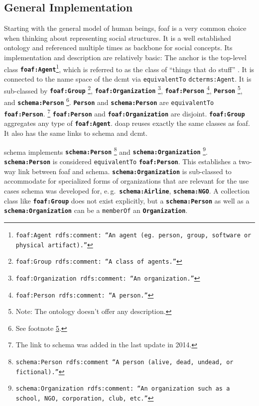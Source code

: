 \documentclass[a4paper, DIV=13, BCOR=0cm]{scrbook}
\newcommand{\eg}{e.\,g.\ }
\newcommand{\class}[1]{\texttt{\textbf{#1}}}
\newcommand{\relation}[1]{\texttt{#1}}
\newcommand{\foottt}[1]{\footnote{\texttt{#1}}}
\begin{document}
\subsection{General Implementation}
\label{human-beings-in-other-ontologies}
Starting with the general model of human beings, \gls{foaf} is a very common choice when thinking about representing social structures. It is a well established ontology and referenced multiple times as backbone for social concepts. Its implementation and description are relatively basic: The anchor is the top-level class \class{foaf:Agent}\foottt{foaf:Agent rdfs:comment: \enquote{An agent (eg. person, group, software or physical artifact).}}, which is referred to as the class of \enquote{things that do stuff} \cite[http://xmlns.com/foaf/spec/\#term\_Agent]{Dan-Brickley2014FOAF-Vocabulary}. It is connected to the name space of the \gls{dcmt} via \relation{equivalentTo} \relation{dcterms:Agent}. It is sub-classed by
%
\class{foaf:Group}%
	\foottt{foaf:Group rdfs:comment: \enquote{A class of agents.}},
%
\class{foaf:Organization}%
	\foottt{foaf:Organization rdfs:comment: \enquote{An organization.}},
%
\class{foaf:Person}%
	\foottt{foaf:Person rdfs:comment: \enquote{A person.}},
%
\class{Person}%
	\footnote{\label{footn:no-desc}Note: The ontology doesn't offer any description.}, and
\class{schema:Person}%
	\footnote{See footnote \ref{footn:no-desc}.}.
\class{Person} and \class{schema:Person} are \relation{equivalentTo} \class{foaf:Person}.%
	\footnote{The link to \gls{schema} was added in the last update in 2014.} \class{foaf:Person} and \class{foaf:Organization} are disjoint. \class{foaf:Group} aggregates any type of \class{foaf:Agent}. \gls{doap} reuses exactly the same classes as \gls{foaf}. It also has the same links to \gls{schema} and \gls{dcmt}.

\gls{schema} implements
\class{schema:Person}%
	\foottt{schema:Person rdfs:comment \enquote{A person (alive, dead, undead, or fictional).}} and
%
\class{schema:Organization}%
	\foottt{schema:Organization rdfs:comment: \enquote{An organization such as a school, NGO, corporation, club, etc.}}.
%
\class{schema:Person} is considered \relation{equivalentTo} \class{foaf:Person}. This establishes a two-way link between \gls{foaf} and \gls{schema}. \class{schema:Organization} is sub-classed to accommodate for specialized forms of organizations that are relevant for the use cases schema was developed for, \eg \class{schema:Airline}, \class{schema:NGO}. A collection class like \class{foaf:Group} does not exist explicitly, but a \class{schema:Person} as well as a \class{schema:Organization} can be a \relation{memberOf} an \class{Organization}.
\end{document}
